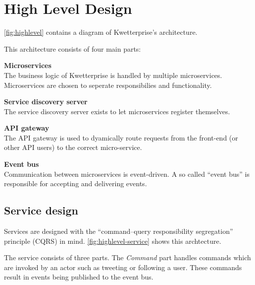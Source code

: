 \chapter{High Level Design}
\cref{fig:highlevel} contains a diagram of Kwetterprise's architecture.

\begin{tefigure}[H][centering]
\end{tefigure}

This architecture consists of four main parts:
\begin{teitemize}
    \item \textbf{Microservices}\\
    The business logic of Kwetterprise is handled by multiple microservices. Microservices are chosen to seperate responsibilies and functionality.
    \item \textbf{Service discovery server}\\
    The service discovery server exists to let microservices register themselves.
    \item \textbf{API gateway}\\
    The API gateway is used to dyamically route requests from the front-end (or other API users) to the correct micro-service.
    \item \textbf{Event bus}\\
    Communication between microservices is event-driven. A so called ``event bus'' is responsible for accepting and delivering events.
\end{teitemize}

\section{Service design}
Services are designed with the ``command–query responsibility segregation'' principle (CQRS) in mind. \cref{fig:highlevel-service} shows this archtecture.

\begin{tefigure}[h][centering]
\end{tefigure}

The service consists of three parts. The \textit{Command} part handles commands which are invoked by an actor such as tweeting or following a user. These commands result in events being published to the event bus.

